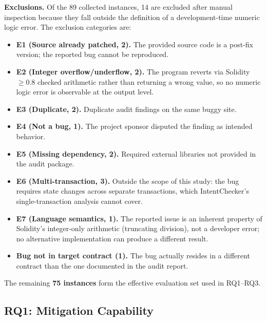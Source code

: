 \documentclass[pdflatex,sn-basic]{sn-jnl}%
\theoremstyle{thmstyleone}%
\theoremstyle{thmstyletwo}%
\theoremstyle{thmstylethree}%
\begin{document}
\smallskip\noindent\textbf{Exclusions.}
Of the 89 collected instances, 14 are excluded after manual inspection because they fall outside the definition of a development-time numeric logic error.
The exclusion categories are:
\begin{itemize}
  \item \textbf{E1 (Source already patched, 2).} The provided source code is a post-fix version; the reported bug cannot be reproduced.
  \item \textbf{E2 (Integer overflow/underflow, 2).} The program reverts via Solidity~$\geq$0.8 checked arithmetic rather than returning a wrong value, so no numeric logic error is observable at the output level.
  \item \textbf{E3 (Duplicate, 2).} Duplicate audit findings on the same buggy site.
  \item \textbf{E4 (Not a bug, 1).} The project sponsor disputed the finding as intended behavior.
  \item \textbf{E5 (Missing dependency, 2).} Required external libraries not provided in the audit package.
  \item \textbf{E6 (Multi-transaction, 3).} Outside the scope of this study: the bug requires state changes across separate transactions, which IntentChecker's single-transaction analysis cannot cover.
  \item \textbf{E7 (Language semantics, 1).} The reported issue is an inherent property of Solidity's integer-only arithmetic (truncating division), not a developer error; no alternative implementation can produce a different result.
  \item \textbf{Bug not in target contract (1).} The bug actually resides in a different contract than the one documented in the audit report.
\end{itemize}
The remaining \textbf{75 instances} form the effective evaluation set used in RQ1--RQ3.

\subsection{RQ1: Mitigation Capability}\label{sec:rq1}
\end{document}
